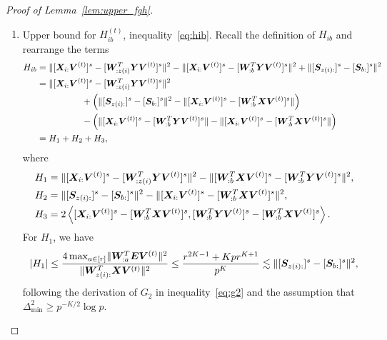 \documentclass[lettersize,onecolumn,journal]{IEEEtran}
\theoremstyle{definition}
\theoremstyle{definition}
\newcommand{\of}[1]{\left(#1\right)}
\newcommand{\ang}[1]{\left\langle#1\right\rangle}
\begin{document}
\begin{proof}[Proof of Lemma~\ref{lem:upper_fgh}]
\begin{enumerate}
    \item Upper bound for $H_{ib}^{(t)}$, inequality~\eqref{eq:hib}. Recall the definition of $H_{ib}$ and rearrange the terms
    \begin{align}
        H_{ib} &= \onormSize{}{ [\mX_{i:} \mV^{(t)}]^s -  [  \mW_{:z(i)}^T \mY \mV^{(t)} ]^s}^2 - \onormSize{}{ [\mX_{i:} \mV^{(t)}]^s -  [  \mW_{:b}^T \mY \mV^{(t)} ]^s}^2 + \onormSize{}{ [ \mS_{z(i):}  ]^s - [ \mS_{b:}  ]^s  }^2 \\
        & =  \onormSize{}{ [ \mX_{i:} \mV^{(t)}]^s -  [  \mW_{:z(i)}^T \mY \mV^{(t)} ]^s}^2 \\
        & \quad \quad \quad \quad \quad + \of{ \onormSize{}{ [ \mS_{z(i):}  ]^s - [ \mS_{b:}  ]^s  }^2 - \onormSize{}{ [\mX_{i:} \mV^{(t)}]^s-  [  \mW_{:b}^T \mX \mV^{(t)} ]^s }  } \\
        & \quad \quad \quad \quad \quad  - \of{\onormSize{}{ [\mX_{i:} \mV^{(t)}]^s-  [  \mW_{:b}^T \mY \mV^{(t)} ]^s } -  \onormSize{}{ [\mX_{i:} \mV^{(t)}]^s-  [  \mW_{:b}^T \mX \mV^{(t)} ]^s }   } \\
        & = H_1 + H_2 + H_3,
    \end{align}
    where 
    \begin{align}
        H_1 &= \onormSize{}{ [ \mX_{i:} \mV^{(t)}]^s -  [  \mW_{:z(i)}^T \mY \mV^{(t)} ]^s}^2 - \onormSize{}{ [ \mW_{:b}^T \mX \mV^{(t)}]^s -  [ \mW_{:b}^T \mY \mV^{(t)}]^s}^2, \\
        H_2 &=  \onormSize{}{ [ \mS_{z(i):}  ]^s - [ \mS_{b:}  ]^s  }^2 - \onormSize{}{ [\mX_{i:} \mV^{(t)}]^s-  [  \mW_{:b}^T \mX \mV^{(t)} ]^s }^2  , \\
        H_3 & = 2 \ang{  [\mX_{i:} \mV^{(t)}]^s  -  [  \mW_{:b}^T \mX \mV^{(t)} ]^s,  [  \mW_{:b}^T \mY \mV^{(t)} ]^s -  [  \mW_{:b}^T \mX \mV^{(t)} ]^s }.
    \end{align}
    For $H_1$, we have 
    \begin{align}
        |H_1| \leq  \frac{4 \max_{a \in [r]}\onormSize{}{ \mW_{:a}^T \mE \mV^{(t)} }^2 }{ \onormSize{}{ \mW_{z(i):}^T\mX \mV^{(t)}}^2}
         \leq  \frac{ r^{2K-1} + K p r^{K+1} }{p^{K}} 
        \lesssim  \onormSize{}{ [ \mS_{z(i):}  ]^s - [ \mS_{b:}  ]^s  }^2\label{eq:h1},
    \end{align}
    following the derivation of $G_2$ in inequality~\eqref{eq:g2} and the assumption that $\Delta_{\min}^2 \geq p^{-K/2} \log p$.
    

\end{enumerate}
\end{proof}
\end{document}
